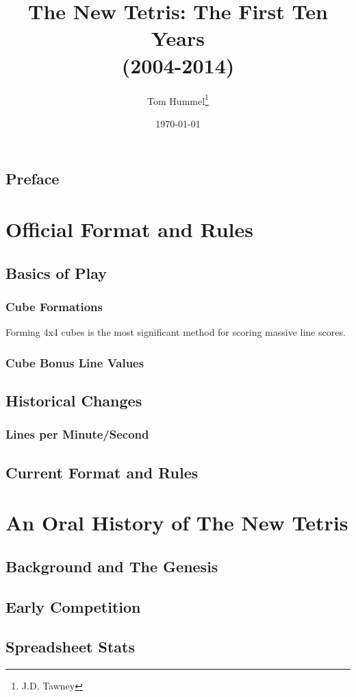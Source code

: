 \documentclass[a4paper,twoside,titlepage]{book}
\title{The New Tetris: The First Ten Years 
\\(2004-2014)}
\author{Tom Hummel\thanks{J.D. Tawney}}
\date{\today}
\begin{document}
  \maketitle
  \tableofcontents
  \newpage
    \chapter{Preface}
      
  \part{Official Format and Rules}
    \chapter{Basics of Play}
      \section{Cube Formations}Forming 4x4 cubes is the most significant method for scoring massive line scores. 
      \section{Cube Bonus Line Values}
    \chapter{Historical Changes}
      \section{Lines per Minute/Second}
    \chapter{Current Format and Rules}
  \part{An Oral History of The New Tetris}
    \chapter{Background and The Genesis}
    \chapter{Early Competition}
    \chapter{Spreadsheet Stats}
\end{document}
